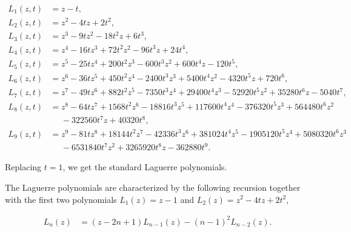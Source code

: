     \begin{align*}
        L_1(z,t) &= z - t, \\
        L_2(z,t) &= z^2 - 4tz + 2t^2,\\
        L_3(z,t) &= z^3 - 9tz^2 - 18t^2z + 6t^3, \\
        L_4(z,t) &= z^4 - 16tz^3 + 72t^2z^2 - 96t^3z + 24t^4,\\
        L_5(z,t) &= z^5 - 25tz^4 + 200t^2z^3 - 600t^3z^2 + 600t^4z - 120t^5,\\
        L_6(z,t) &= z^6 - 36tz^5 + 450t^2z^4 - 2400t^3z^3 + 5400t^4z^2 - 4320t^5z + 720t^6, \\
        L_7(z,t) &= z^7 - 49tz^6 + 882t^2z^5 -7350t^3z^4 + 29400t^4z^3 - 52920t^5z^2 + 35280t^6z - 5040t^7,\\
        L_8(z,t) &= z^8 - 64tz^7 + 1568t^2z^6 - 18816t^3z^5 + 117600t^4z^4 - 376320t^5z^3 + 564480t^6z^2\\ &\phantom{=}- 322560t^7z + 40320t^8,\\
        L_9(z,t) &= z^{9}-81tz^{8}+18144t^2z^{7}-42336t^3z^{6}+381024t^4z^{5}-1905120t^5z^{4}+5080320t^6z^{3}\\ 
        &\phantom{=}-6531840t^7z^{2} +3265920t^8z-362880t^9.
    \end{align*}

    Replacing $t=1$, we get the standard Laguerre polynomials.

    The Laguerre polynomials are characterized by the following recursion together with the first two polynomials $L_1(z)=z-1$ and $L_2(z)=z^2-4tz + 2t^2$,

    \begin{align*}
        L_n(z) &= (z-2n+1)L_{n-1}(z) - (n-1)^2L_{n-2}(z).
    \end{align*}


